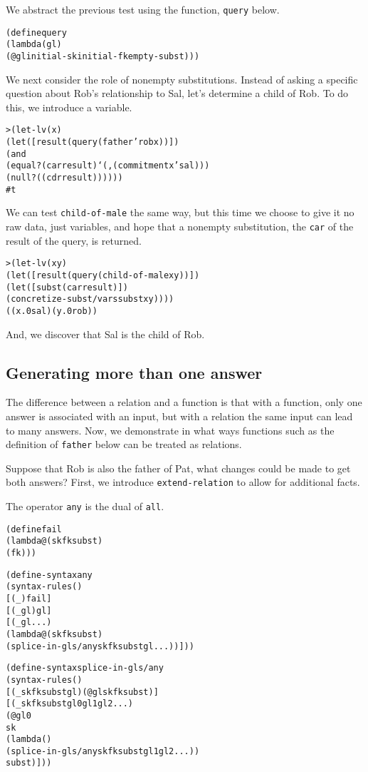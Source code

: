 We abstract the previous test using the function, \texttt{query}
below.

\begin{alltt}
(define query
  (lambda (gl)
    (@ gl initial-sk initial-fk empty-subst)))
\end{alltt}

We next consider the role of nonempty substitutions.  Instead of
asking a specific question about Rob's relationship to Sal, let's
determine a child of Rob.  To do this, we introduce a variable.

\begin{alltt}
> (let-lv (x)
    (let ([result (query (father 'rob x))])
      (and
        (equal? (car result) `(,(commitment x 'sal)))
        (null? ((cdr result))))))
#t
\end{alltt}

We can test \texttt{child-of-male} the same way, but this time we
choose to give it no raw data, just variables, and hope that a
nonempty substitution, the \texttt{car} of the result of the query, is
returned.

\begin{alltt}
> (let-lv (x y)
    (let ([result (query (child-of-male x y))])
      (let ([subst (car result)])
        (concretize-subst/vars subst x y))))
((x.0 sal) (y.0 rob))
\end{alltt}

And, we discover that Sal is the child of Rob.

\subsection{Generating more than one answer}

The difference between a relation and a function is that with a
function, only one answer is associated with an input, but with a
relation the same input can lead to many answers.  Now, we demonstrate
in what ways functions such as the definition of \texttt{father}
below can be treated as relations.

Suppose that Rob is also the father of Pat, what changes could be
made to get both answers?  First, we introduce
\texttt{extend-relation} to allow for additional facts.

The operator \texttt{any} is the dual of \texttt{all}.

\begin{alltt}
(define fail
  (lambda@ (sk fk subst)
    (fk)))

(define-syntax any
  (syntax-rules ()
    [(_) fail]
    [(_ gl) gl]
    [(_ gl ...)
      (lambda@ (sk fk subst)
	(splice-in-gls/any sk fk subst gl ...))]))

(define-syntax splice-in-gls/any
  (syntax-rules ()
    [(_ sk fk subst gl) (@ gl sk fk subst)]
    [(_ sk fk subst gl0 gl1 gl2 ...)
     (@ gl0
        sk
        (lambda ()
          (splice-in-gls/any sk fk subst gl1 gl2 ...))
       subst)]))
\end{alltt}

